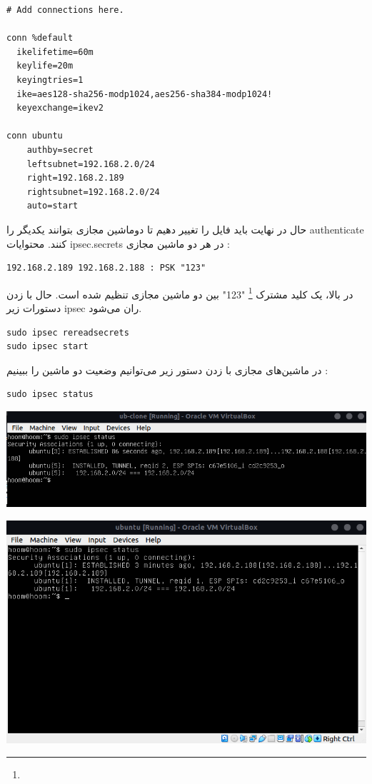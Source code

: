 \begin{enumerate}[label=\alph*)]
\begin{latin}
\begin{lstlisting}
# Add connections here.

conn %default
  ikelifetime=60m
  keylife=20m
  keyingtries=1
  ike=aes128-sha256-modp1024,aes256-sha384-modp1024!
  keyexchange=ikev2

conn ubuntu
    authby=secret
    leftsubnet=192.168.2.0/24
    right=192.168.2.189
    rightsubnet=192.168.2.0/24
    auto=start
\end{lstlisting}
\end{latin}
حال در نهایت باید فایل 
را تغییر دهیم تا دوماشین مجازی بتوانند یکدیگر را 
authenticate کنند.
محتوایات ipsec.secrets در هر دو ماشین مجازی : 


\begin{latin}
\begin{lstlisting}
192.168.2.189 192.168.2.188 : PSK "123"
\end{lstlisting}
\end{latin}
در بالا، یک کلید مشترک 
\footnote{}
"123"
بین دو ماشین مجازی تنظیم شده است.
حال با زدن دستورات زیر ipsec ران می‌شود.
\begin{latin}
\begin{lstlisting}
sudo ipsec rereadsecrets
sudo ipsec start
\end{lstlisting}
\end{latin}
در ماشین‌های مجازی با زدن دستور زیر می‌توانیم وضعیت دو ماشین را ببینیم : 
\begin{latin}
\begin{lstlisting}
sudo ipsec status
\end{lstlisting}
  \end{latin}
  \begin{center}
    \includegraphics[scale=0.5]{pics/ipsec1.png}
  \end{center}
  \begin{center}
    \includegraphics[scale=0.5]{pics/ipsec2.png}
  \end{center}
\end{enumerate}
